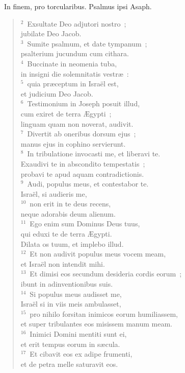 ~\lettrine[lines=10,image=true,loversize=0.05,lraise=-0.03]{I}{}n finem, pro torcularibus. Psalmus ipsi Asaph.
\begin{flushleft}\begin{verse}\vspace{6pt}${}^{2}$~Exsultate Deo adjutori nostro~;\\ jubilate Deo Jacob.\\
${}^{3}$~Sumite psalmum, et date tympanum~;\\ psalterium jucundum cum cithara.\\
${}^{4}$~Buccinate in neomenia tuba,\\ in insigni die solemnitatis vestr\ae~:\\
${}^{5}$~quia pr\ae ceptum in Isra\"el est,\\ et judicium Deo Jacob.\\
${}^{6}$~Testimonium in Joseph posuit illud,\\ cum exiret de terra \AE gypti~;\\ linguam quam non noverat, audivit.\\
${}^{7}$~Divertit ab oneribus dorsum ejus~;\\ manus ejus in cophino servierunt.\\
${}^{8}$~In tribulatione invocasti me, et liberavi te.\\ Exaudivi te in abscondito tempestatis~;\\ probavi te apud aquam contradictionis.\\
${}^{9}$~Audi, populus meus, et contestabor te.\\ Isra\"el, si audieris me,\\
${}^{10}$~non erit in te deus recens,\\ neque adorabis deum alienum.\\
${}^{11}$~Ego enim sum Dominus Deus tuus,\\ qui eduxi te de terra \AE gypti.\\ Dilata os tuum, et implebo illud.\\
${}^{12}$~Et non audivit populus meus vocem meam,\\ et Isra\"el non intendit mihi.\\
${}^{13}$~Et dimisi eos secundum desideria cordis eorum~;\\ ibunt in adinventionibus suis.\\
${}^{14}$~Si populus meus audisset me,\\ Isra\"el si in viis meis ambulasset,\\
${}^{15}$~pro nihilo forsitan inimicos eorum humiliassem,\\ et super tribulantes eos misissem manum meam.\\
${}^{16}$~Inimici Domini mentiti sunt ei,\\ et erit tempus eorum in s\ae cula.\\
${}^{17}$~Et cibavit eos ex adipe frumenti,\\ et de petra melle saturavit eos.\end{verse}\end{flushleft}


